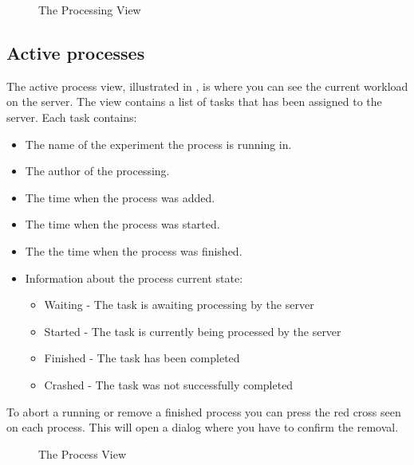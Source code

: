\begin{figure}[h]
\caption{The Processing View}
\label{fig:and_processing_man}
\end{figure}
\FloatBarrier

\subsection{Active processes}
The active process view, illustrated in , is where you can see the current workload on the server. The view contains a list of tasks that has been assigned to the server. Each task contains:
\begin{itemize}
\item The name of the experiment the process is running in.
\item The author of the processing.
\item The time when the process was added.
\item The time when the process was started.
\item The the time when the process was finished. 
\item Information about the process current state:
\begin{itemize}
\item Waiting  - The task is awaiting processing by the server
\item Started  - The task is currently being processed by the server
\item Finished - The task has been completed
\item Crashed - The task was not successfully completed
\end{itemize}
\end{itemize}

To abort a running or remove a finished process you can press the red cross seen on each process. This will open a dialog where you have to confirm the removal.


\begin{figure}[h]
\caption{ The Process View}
\label{fig:and_process_man}
\end{figure}

\FloatBarrier
